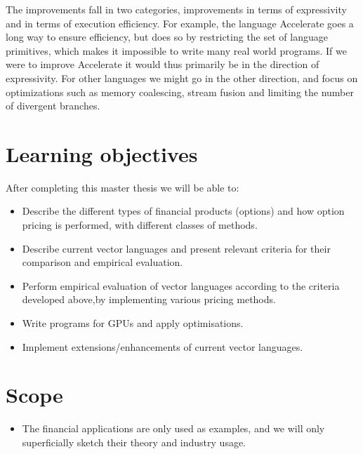 \documentclass[10pt,a4paper,final,oneside,openany,article]{memoir}
\begin{document}
The improvements fall in two categories, improvements in terms of
expressivity and in terms of execution efficiency. For example, the
language Accelerate goes a long way to ensure efficiency, but does so
by restricting the set of language primitives, which makes it
impossible to write many real world programs. If we were to improve
Accelerate it would thus primarily be in the direction of
expressivity. For other languages we might go in the other direction,
and focus on optimizations such as memory coalescing, stream fusion
and limiting the number of divergent branches.

\chapter{Learning objectives}
After completing this master thesis we will be able to:
\begin{itemize}
\item Describe the different types of financial products (options) and
  how option pricing is performed, with different classes of methods.
\item Describe current vector languages and present relevant criteria
  for their comparison and empirical evaluation.
\item Perform empirical evaluation of vector languages according to
  the criteria developed above,by implementing various pricing
  methods.
\item Write programs for GPUs and apply optimisations.
\item Implement extensions/enhancements of current vector languages.
\end{itemize}

\chapter{Scope}
\begin{itemize}
\item The financial applications are only used as examples, and we
  will only superficially sketch their theory and industry usage.
\end{itemize}

{} 
\printbibliography

\end{document}
